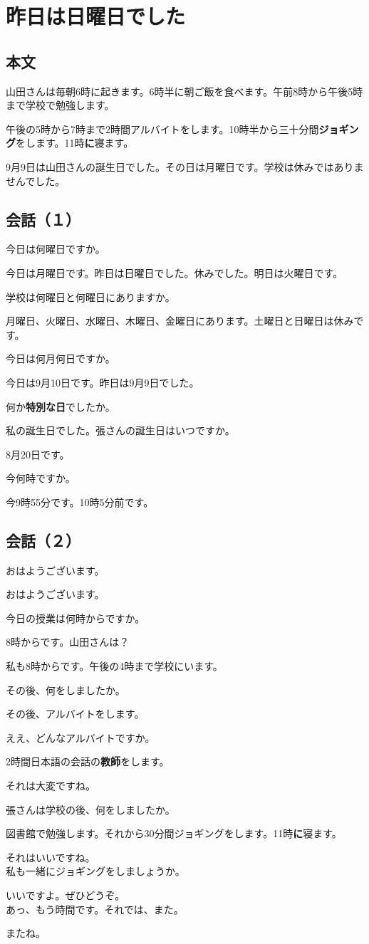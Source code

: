 \documentclass[a5j]{ltjarticle}
\newcommand*{\YamadaSpeaks}{\item[山田：]}
\newcommand*{\ZhangSpeaks}{\item[張：]}
\begin{document}
\section{昨日は日曜日でした}

\subsection*{本文}

山田さんは毎朝6時に起きます。6時半に朝ご飯を食べます。午前8時から午後5時まで学校で勉強します。

午後の5時から7時まで2時間アルバイトをします。10時半から三十分間\textbf{ジョギング}をします。11時\textbf{に}寝ます。

9月9日は山田さんの誕生日でした。その日は月曜日です。学校は休みではありませんでした。

\subsection*{会話（１）}

\begin{dialogue}
  \ZhangSpeaks
  今日は何曜日ですか。
  \YamadaSpeaks
  今日は月曜日です。昨日は日曜日でした。休みでした。明日は火曜日です。
  \ZhangSpeaks
  学校は何曜日と何曜日にありますか。
  \YamadaSpeaks
  月曜日、火曜日、水曜日、木曜日、金曜日にあります。土曜日と日曜日は休みです。
  \ZhangSpeaks
  今日は何月何日ですか。
  \YamadaSpeaks
  今日は9月10日です。昨日は9月9日でした。
  \ZhangSpeaks
  何か\textbf{特別な日}でしたか。
  \YamadaSpeaks
  私の誕生日でした。張さんの誕生日はいつですか。
  \ZhangSpeaks
  8月20日です。
  \YamadaSpeaks
  今何時ですか。
  \ZhangSpeaks
  今9時55分です。10時5分前です。
\end{dialogue}

\subsection*{会話（２）}

\begin{dialogue}
  \YamadaSpeaks
  おはようございます。
  \ZhangSpeaks
  おはようございます。
  \YamadaSpeaks
  今日の授業は何時からですか。
  \ZhangSpeaks
  8時からです。山田さんは？
  \YamadaSpeaks
  私も8時からです。午後の4時まで学校にいます。
  \ZhangSpeaks
  その後、何をしましたか。
  \YamadaSpeaks
  その後、アルバイトをします。
  \ZhangSpeaks
  ええ、どんなアルバイトですか。
  \YamadaSpeaks
  2時間日本語の会話の\textbf{教師}をします。
  \ZhangSpeaks
  それは大変ですね。
  \YamadaSpeaks
  張さんは学校の後、何をしましたか。
  \ZhangSpeaks
  図書館で勉強します。それから30分間ジョギングをします。11時\textbf{に}寝ます。
  \YamadaSpeaks
  それはいいですね。\\
  私も一緒にジョギングをしましょうか。
  \ZhangSpeaks
  いいですよ。ぜひどうぞ。\\
  あっ、もう時間です。それでは、また。
  \YamadaSpeaks
  またね。
\end{dialogue}
\end{document}
